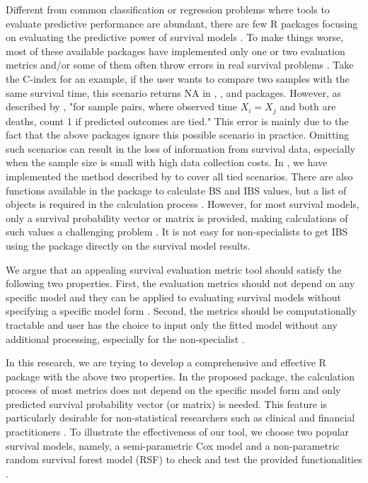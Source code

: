 Different from common classification or regression problems where tools to evaluate predictive performance are abundant, there are few R packages focusing on evaluating the predictive power of survival models \citep{Hmisc.2019, ipred.2009}. To make things worse, most of these available packages have implemented only one or two evaluation metrics and/or some of them often throw errors in real survival problems \citep{ipred.2009}. Take the C-index for an example, if the user wants to compare two samples with the same survival time, this scenario returns NA in , , and  packages. However, as described by \cite{Ishwaran.2008}, "for sample pairs, where observed time $X_i = X_j$ and both are deaths, count 1 if predicted outcomes are tied." This error is mainly due to the fact that the above packages ignore this possible scenario in practice. Omitting such scenarios can result in the loss of information from survival data, especially when the sample size is small with high data collection costs. In , we have implemented the method described by \cite{Ishwaran.2008} to cover all tied scenarios.
There are also functions available in the  package to calculate BS and IBS values, but a list of  objects is required in the calculation process \citep{ipred.2009}. However, for most survival models, only a survival probability vector or matrix is provided, making calculations of such values a challenging problem \citep{Ishwaran.2008}. It is not easy for non-specialists to get IBS using the  package directly on the survival model results.

We argue that an appealing survival evaluation metric tool should satisfy the following two properties. First, the evaluation metrics should not depend on any specific model and they can be applied to evaluating survival models without specifying a specific model form \citep{survcomp.2011}. Second, the metrics should be computationally tractable and user has the choice to input only the fitted model without any additional processing, especially for the non-specialist  \citep{Harrell.1982, Graf.1999, Hoora.2017, Ishwaran.2008}.

In this research, we are trying to develop a comprehensive and effective R package with the above two properties. In the proposed  package, the calculation process of most metrics does not depend on the specific model form and only predicted survival probability vector (or matrix) is needed. This feature is particularly desirable for non-statistical researchers such as clinical and financial practitioners \citep{ali.2021}. To illustrate the effectiveness of our tool, we choose two popular survival models, namely, a semi-parametric Cox model and a non-parametric random survival forest model (RSF) to check and test the provided functionalities \citep{cox.1972, Ishwaran.2008}.

